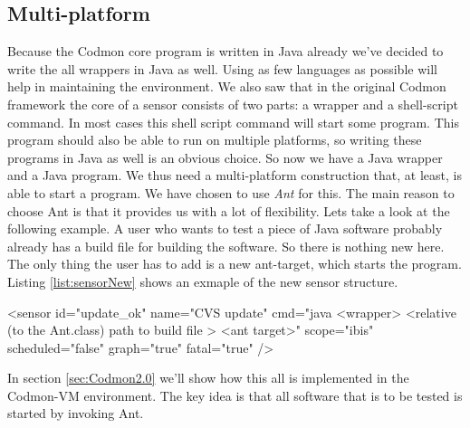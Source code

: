 \documentclass{article}
\newcommand{\project}{Codmon-VM}
\begin{document}
\subsection{Multi-platform}
\label{road:multi}
Because the Codmon core program is written in Java already we've decided to write the all wrappers in Java as well. Using as few languages as possible will help in maintaining the environment. 
We also saw that in the original Codmon framework the core of a sensor consists of two parts: a wrapper and a shell-script command. In most cases this shell script command will start some 
program. This program should also be able to run on multiple platforms, so writing these programs in Java as well is an obvious choice. So now we have a Java wrapper and a Java program. We thus need a 
multi-platform construction that, at least, is able to start a program. We have chosen to use \emph{Ant} for this. The main reason to choose Ant is that it provides us with a lot of flexibility. Lets take 
a look at the following example. A user who wants to test a piece of Java software probably already has a build file for building the software. So there is nothing new here. The only thing the user has 
to add is a new ant-target, which starts the program. Listing \ref{list:sensorNew} shows an exmaple of the new sensor structure.

\begin{code}[frame=shadowbox, language=XML,showstringspaces=false]
 <sensor id="update_ok" 
    name="CVS update" 
    cmd="java <wrapper> <relative (to the Ant.class) path to build file > <ant target>" 
    scope="ibis" 
    scheduled="false" 
    graph="true" 
    fatal="true" />
\end{code}

In section \ref{sec:Codmon2.0} we'll show how this all is implemented in the \project{} environment. The key idea is that all software that is to be tested is started by invoking Ant.\\
\end{document}
